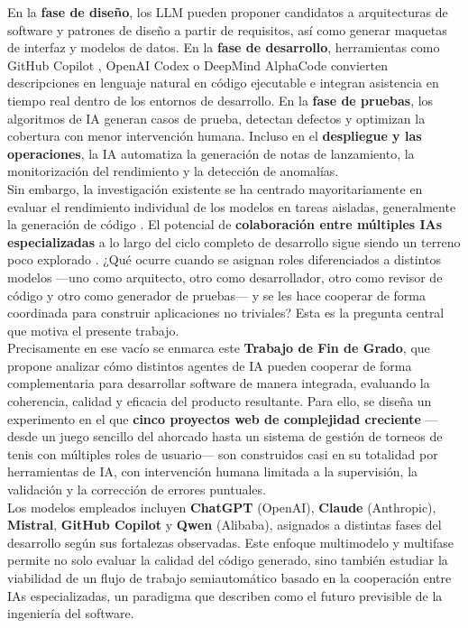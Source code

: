 En la \textbf{fase de diseño}, los \ac{LLM} pueden proponer candidatos a arquitecturas de software y patrones de diseño a partir de requisitos, así como generar maquetas de interfaz y modelos de datos. En la \textbf{fase de desarrollo}, herramientas como GitHub Copilot \cite{URL::Copilot}, OpenAI Codex \cite{URL::Codex} o DeepMind AlphaCode \cite{URL::AlphaCode} convierten descripciones en lenguaje natural en código ejecutable e integran asistencia en tiempo real dentro de los entornos de desarrollo. En la \textbf{fase de pruebas}, los algoritmos de IA generan casos de prueba, detectan defectos y optimizan la cobertura con menor intervención humana. Incluso en el \textbf{despliegue y las operaciones}, la \ac{IA} automatiza la generación de notas de lanzamiento, la monitorización del rendimiento y la detección de anomalías.\\

Sin embargo, la investigación existente se ha centrado mayoritariamente en evaluar el rendimiento individual de los modelos en tareas aisladas, generalmente la generación de código \cite{Wang:2023:LLMReview, Tosi:2024:CodeQuality}. El potencial de \textbf{colaboración entre múltiples \ac{IA}s especializadas} a lo largo del ciclo completo de desarrollo sigue siendo un terreno poco explorado \cite{Turunen:2023:FromIdeas}. ¿Qué ocurre cuando se asignan roles diferenciados a distintos modelos ---uno como arquitecto, otro como desarrollador, otro como revisor de código y otro como generador de pruebas--- y se les hace cooperar de forma coordinada para construir aplicaciones no triviales? Esta es la pregunta central que motiva el presente trabajo.\\

Precisamente en ese vacío se enmarca este \textbf{Trabajo de Fin de Grado}, que propone analizar cómo distintos agentes de \ac{IA} pueden cooperar de forma complementaria para desarrollar software de manera integrada, evaluando la coherencia, calidad y eficacia del producto resultante. Para ello, se diseña un experimento en el que \textbf{cinco proyectos web de complejidad creciente} ---desde un juego sencillo del ahorcado hasta un sistema de gestión de torneos de tenis con múltiples roles de usuario--- son construidos casi en su totalidad por herramientas de \ac{IA}, con intervención humana limitada a la supervisión, la validación y la corrección de errores puntuales.\\

Los modelos empleados incluyen \textbf{ChatGPT} (OpenAI), \textbf{Claude} (Anthropic), \textbf{Mistral}, \textbf{GitHub Copilot} y \textbf{Qwen} (Alibaba), asignados a distintas fases del desarrollo según sus fortalezas observadas. Este enfoque multimodelo y multifase permite no solo evaluar la calidad del código generado, sino también estudiar la viabilidad de un flujo de trabajo semiautomático basado en la cooperación entre IAs especializadas, un paradigma que \cite{Khade:2025:AIinSD} describen como el futuro previsible de la ingeniería del software.\\ \\

